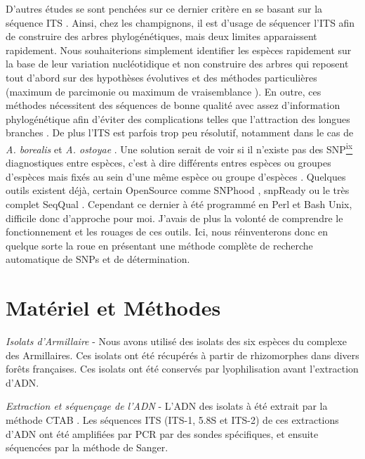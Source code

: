 D'autres études se sont penchées sur ce dernier critère en se basant sur la séquence ITS  \cite{Kim2006, Coetzee2003}. Ainsi, chez les champignons, il est d'usage de séquencer l'ITS afin de construire des arbres phylogénétiques, mais deux limites apparaissent rapidement. Nous souhaiterions simplement identifier les espèces rapidement sur la base de leur variation nucléotidique et non construire des arbres qui reposent tout d'abord sur des hypothèses évolutives et des méthodes particulières (maximum de parcimonie ou maximum de vraisemblance \cite{Tamura2011, Sober2004}). En outre, ces méthodes nécessitent des séquences de bonne qualité avec assez d'information phylogénétique afin d'éviter des complications telles que l'attraction des longues branches \cite{Bergsten2005}. De plus l'ITS est parfois trop peu résolutif, notamment dans le cas de \textit{A. borealis} et \textit{A. ostoyae} \cite{Tsykun2013}. Une solution serait de voir si il n'existe pas des SNP\hyperref[bib:biblioIX]{\textsuperscript{ix}} diagnostiques entre espèces, c'est à dire différents entres espèces ou groupes d'espèces mais fixés au sein d'une même espèce ou groupe d'espèces \cite{Tsykun2017}. Quelques outils existent déjà, certain OpenSource comme SNPhood \cite{Arnold2016}, snpReady \cite{Granato2018} ou le très complet SeqQual \cite{Lang2021}. Cependant ce dernier à été programmé en Perl et Bash Unix, difficile donc d'approche pour moi. J'avais de plus la volonté de comprendre le fonctionnement et les rouages de ces outils. Ici, nous réinventerons donc en quelque sorte la roue en présentant une méthode complète de recherche automatique de SNPs et de détermination.

\section{Matériel et Méthodes}

\textit{Isolats d'Armillaire} - Nous avons utilisé des isolats des six espèces du complexe des Armillaires. Ces isolats ont été récupérés à partir de rhizomorphes dans divers forêts françaises. Ces isolats ont été conservés par lyophilisation avant l'extraction d'ADN.

\textit{Extraction et séquençage de l'ADN} - L'ADN des isolats à été extrait par la méthode CTAB \cite{Gardes1993}. Les séquences ITS (ITS-1, 5.8S et ITS-2) de ces extractions d'ADN ont été amplifiées par PCR par des sondes spécifiques, et ensuite séquencées par la méthode de Sanger.

